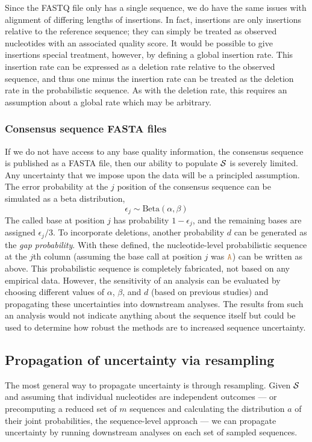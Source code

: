 \documentclass[10pt]{article}
\begin{document}
Since the FASTQ file only has a single sequence, we do have the same issues with alignment of differing lengths of insertions.
In fact, insertions are only insertions relative to the reference sequence; they can simply be treated as observed nucleotides with an associated quality score.
It would be possible to give insertions special treatment, however, by defining a global insertion rate.
This insertion rate can be expressed as a deletion rate relative to the observed sequence, and thus one minus the insertion rate can be treated as the deletion rate in the probabilistic sequence.
As with the deletion rate, this requires an assumption about a global rate which may be arbitrary.


\subsubsection{Consensus sequence FASTA files}


If we do not have access to any base quality information, \eg the consensus sequence is published as a FASTA file, then our ability to populate $\mathcal{S}$ is severely limited.
Any uncertainty that we impose upon the data will be a principled assumption.
The error probability at the $j$ position of the consensus sequence can be simulated as a beta distribution, \ie 
$$
\epsilon_j \sim\text{Beta}(\alpha, \beta)
$$
The called base at position $j$ has probability $1-\epsilon_j$, and the remaining bases are assigned $\epsilon_j/3$.
To incorporate deletions, another probability $d$ can be generated as the \emph{gap probability}.
With these defined, the nucleotide-level probabilistic sequence at the $j$th column (assuming the base call at position $j$ was $\texttt{\textcolor{brown}{A}}$) can be written as above.
This probabilistic sequence is completely fabricated, \ie not based on any empirical data.
However, the sensitivity of an analysis can be evaluated by choosing different values of $\alpha$, $\beta$, and $d$ (\eg based on previous studies) and propagating these uncertainties into downstream analyses.
The results from such an analysis would not indicate anything about the sequence itself but could be used to determine how robust the methods are to increased sequence uncertainty.


\subsection{Propagation of uncertainty via resampling}

The most general way to propagate uncertainty is through resampling.
Given $\mathcal{S}$ and assuming that individual nucleotides are independent outcomes --- or precomputing a reduced set of $m$ sequences and calculating the distribution $a$ of their joint probabilities, \ie the sequence-level approach --- we can propagate uncertainty by running downstream analyses on each set of sampled sequences.
\end{document}
